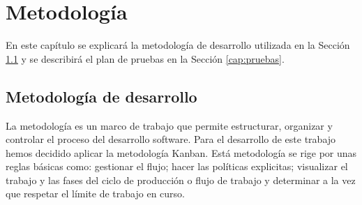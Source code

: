 \chapter{Metodología}
\label{cap:metodologia}
En este capítulo se explicará la metodología de desarrollo utilizada en la Sección \ref{cap:Kanban} y se describirá el plan de pruebas en la Sección \ref{cap:pruebas}.
\section{Metodología de desarrollo}
\label{cap:Kanban}
La metodología es un marco de trabajo que permite estructurar, organizar y controlar el proceso del desarrollo software. Para el desarrollo de este trabajo hemos decidido aplicar la metodología Kanban. Está metodología se rige por unas reglas básicas como: gestionar el flujo; hacer las políticas explicitas; visualizar el trabajo y las fases del ciclo de producción o flujo de trabajo y determinar a la vez que respetar el límite de trabajo en curso.

